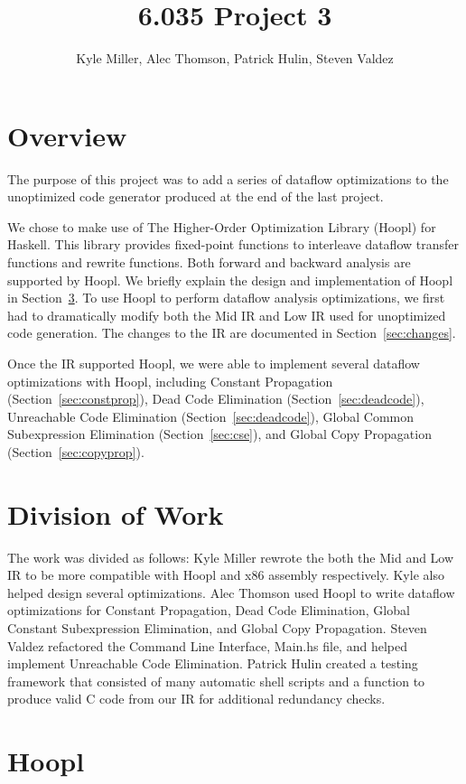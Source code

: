 \documentclass[11pt]{article}
\title{6.035 Project 3}
\author{Kyle Miller, Alec Thomson, Patrick Hulin, Steven Valdez}
\begin{document}
 
\maketitle


\section {Overview} 

The purpose of this project was to add a series of dataflow optimizations to the unoptimized code generator produced at the end of the last project. 

We chose to make use of The Higher-Order Optimization Library (Hoopl) for Haskell. This library provides fixed-point functions to interleave dataflow transfer functions and rewrite functions. Both forward and backward analysis are supported by Hoopl. We briefly explain the design and implementation of Hoopl in Section~\ref{sec:hoopl}. To use Hoopl to perform dataflow analysis optimizations, we first had to dramatically modify both the Mid IR and Low IR used for unoptimized code generation. The changes to the IR are documented in Section~\ref{sec:changes}. 

Once the IR supported Hoopl, we were able to implement several dataflow optimizations with Hoopl, including Constant Propagation (Section~\ref{sec:constprop}), Dead Code Elimination (Section~\ref{sec:deadcode}), Unreachable Code Elimination (Section~\ref{sec:deadcode}), Global Common Subexpression Elimination (Section~\ref{sec:cse}), and Global Copy Propagation (Section~\ref{sec:copyprop}). 
\section {Division of Work} 
\label{sec:division} 

The work was divided as follows: Kyle Miller rewrote the both the Mid and Low IR to be more compatible with Hoopl and x86 assembly respectively. Kyle also helped design several optimizations. Alec Thomson used Hoopl to write dataflow optimizations for Constant Propagation, Dead Code Elimination, Global Constant Subexpression Elimination, and Global Copy Propagation. Steven Valdez refactored the Command Line Interface, Main.hs file, and helped implement Unreachable Code Elimination. Patrick Hulin created a testing framework that consisted of many automatic shell scripts and a function to produce valid C code from our IR for additional redundancy checks. 

\section {Hoopl}
\label{sec:hoopl} 
\end{document}
